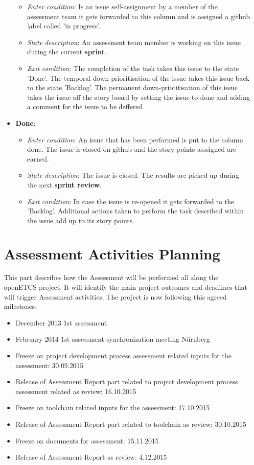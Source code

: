 \documentclass[openetcs]{template/openetcs_article}
\begin{document}
\begin{itemize}
\begin{itemize}
\item \textit{Enter condition}: Is an issue self-assignment by a member of the assessment team it gets forwarded to this column and is assigned a github label called 'in progress'.
\item \textit{State description}: An assessment team member is working on this issue during the current \textbf{sprint}.
\item \textit{Exit condition}: The completion of the task takes this issue to the state 'Done'. The temporal down-prioritisation of the issue takes this issue back to the state 'Backlog'. The permanent down-priotitisation of this issue takes the issue off the story board by setting the issue to done and adding a comment for the issue to be deffered.
\end{itemize}

\item \textbf{Done}: 
\begin{itemize}
\item \textit{Enter condition}: An issue that has been performed is put to the column done. The issue is closed on github and the story points asssigned are earned.
\item \textit{State description}: The issue is closed. The results are picked up during the next \textbf{sprint review}. 
\item \textit{Exit condition}: In case the issue is re-opened it gets forwarded to the 'Backlog'. Additional actions taken to perform the task described within the issue add up to its story points.
\end{itemize}
\end{itemize}


\section{Assessment Activities Planning}
This part describes how the Assessment will be performed all along the openETCS project. It will identify the main project outcomes and deadlines that will trigger Assessment activities. The project is now following this agreed milestones: 
\label{assessmentmilestones}

\begin{itemize}
\item December 2013 1st assessment
\item February 2014 1st assessment synchronization meeting N\"urnberg
\item Freeze on project development process assessment related inputs for the assessment: 30.09.2015
\item Release of Assessment Report part related to project development process assessment related as review: 16.10.2015
\item Freeze on toolchain related inputs for the assessment: 17.10.2015
\item Release of Assessment Report part related to toolchain as review: 30.10.2015
\item Freeze on documents for assessment: 15.11.2015
\item Release of Assessment Report as review: 4.12.2015
\end{itemize}
\end{document}

